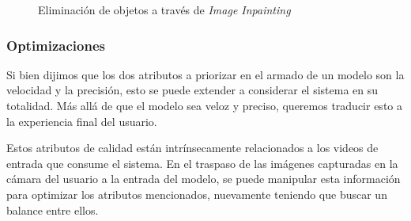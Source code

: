 \documentclass[a4paper]{article}
\begin{document}
\begin{figure}[H]
\caption{Eliminación de objetos a través de \textit{Image Inpainting}}
\end{figure}

\subsubsection{Optimizaciones}

Si bien dijimos que los dos atributos a priorizar en el armado de un modelo son la velocidad y la precisión, esto se puede extender a considerar el sistema en su totalidad. Más allá de que el modelo sea veloz y preciso, queremos traducir esto a la experiencia final del usuario.

Estos atributos de calidad están intrínsecamente relacionados a los videos de entrada que consume el sistema. En el traspaso de las imágenes capturadas en la cámara del usuario a la entrada del modelo, se puede manipular esta información para optimizar los atributos mencionados, nuevamente teniendo que buscar un balance entre ellos. \medskip
\end{document}
